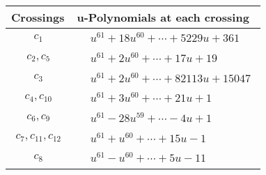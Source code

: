 \documentclass[1p]{elsarticle_modified}
\theoremstyle{definition}
\begin{document}
\begin{tabular}{m{50pt}|m{274pt}}
Crossings & \hspace{64pt}u-Polynomials at each crossing \\
\hline $$\begin{aligned}c_{1}\end{aligned}$$&$\begin{aligned}
&u^{61}+18 u^{60}+\cdots+5229 u+361
\end{aligned}$\\
\hline $$\begin{aligned}c_{2},c_{5}\end{aligned}$$&$\begin{aligned}
&u^{61}+2 u^{60}+\cdots+17 u+19
\end{aligned}$\\
\hline $$\begin{aligned}c_{3}\end{aligned}$$&$\begin{aligned}
&u^{61}+2 u^{60}+\cdots+82113 u+15047
\end{aligned}$\\
\hline $$\begin{aligned}c_{4},c_{10}\end{aligned}$$&$\begin{aligned}
&u^{61}+3 u^{60}+\cdots+21 u+1
\end{aligned}$\\
\hline $$\begin{aligned}c_{6},c_{9}\end{aligned}$$&$\begin{aligned}
&u^{61}-28 u^{59}+\cdots-4 u+1
\end{aligned}$\\
\hline $$\begin{aligned}c_{7},c_{11},c_{12}\end{aligned}$$&$\begin{aligned}
&u^{61}+u^{60}+\cdots+15 u-1
\end{aligned}$\\
\hline $$\begin{aligned}c_{8}\end{aligned}$$&$\begin{aligned}
&u^{61}- u^{60}+\cdots+5 u-11
\end{aligned}$\\
\hline
\end{tabular}\\~\\
\newpage\renewcommand{\arraystretch}{1}
\end{document}
